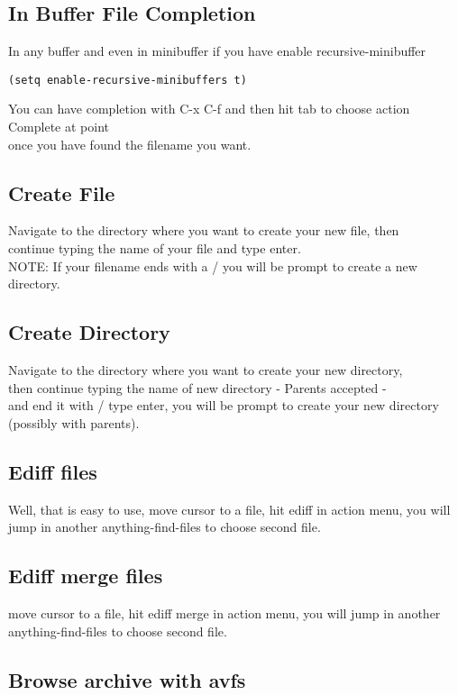 \documentclass[a4paper,11pt]{article}
\begin{document}
\subsection{In Buffer File Completion}
\label{sec:buff-file-compl}
In any buffer and even in minibuffer if you have enable recursive-minibuffer
\begin{verbatim}
(setq enable-recursive-minibuffers t)
\end{verbatim}
You can have completion with C-x C-f and then hit tab to choose action Complete at point \\ 
once you have found the filename you want.
\subsection{Create File}
\label{sec:create-file}
Navigate to the directory where you want to create your new file, then \\
continue typing the name of your file and type enter. \\
NOTE: If your filename ends with a / you will be prompt to create a new directory.

\subsection{Create Directory}
\label{sec:create-directory}
Navigate to the directory where you want to create your new directory, \\
then continue typing the name of new directory - Parents accepted - \\
and end it with / type enter, you will be prompt to create your new directory (possibly with parents).

\subsection{Ediff files}
\label{sec:ediff-files}
Well, that is easy to use, 
move cursor to a file, hit ediff in action menu, you will jump in
another anything-find-files to choose second file.
\subsection{Ediff merge files}
\label{sec:ediff-merge-files}
move cursor to a file, hit ediff merge in action menu, you will jump in
another anything-find-files to choose second file.

\subsection{Browse archive with avfs}
\label{sec:browse-archive-with}
\end{document}

